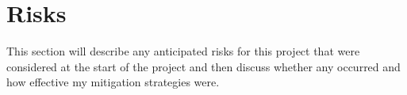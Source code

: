 
\section{Risks}

This section will describe any anticipated risks for this project that were considered at the start of the project and then discuss whether any occurred and how effective my mitigation strategies were.


